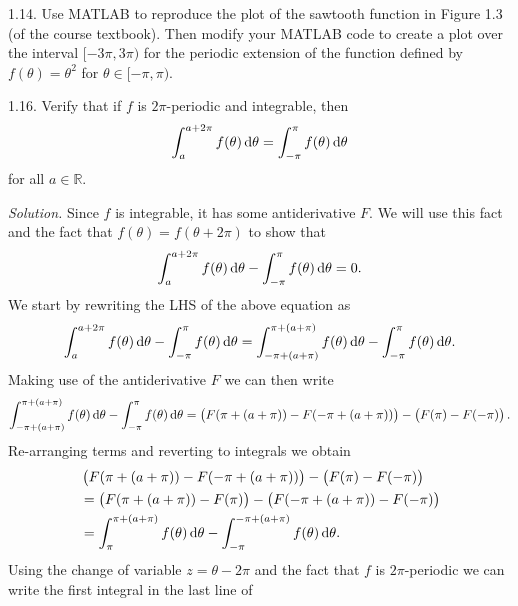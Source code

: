 \documentclass{article}
\newcommand{\R}{\mathbb{R}}
\begin{document}
\newpage

1.14. Use MATLAB to reproduce the plot of the sawtooth function in
  Figure 1.3 (of the course textbook). Then modify your MATLAB code to
  create a plot over the interval $[-3 \pi, 3 \pi)$ for the periodic
  extension of the function defined by $f(\theta) = \theta^2$ for
  $\theta \in [-\pi, \pi)$.

\newpage

1.16. Verify that if $f$ is $2\pi$-periodic and integrable, then
%
\begin{equation*}
    \int_a^{a + 2 \pi} f(\theta) \dif \theta = \int_{-\pi}^\pi f(\theta) \dif \theta
\end{equation*}
%
for all $a \in \R$.

\textit{Solution.} Since $f$ is integrable, it has some antiderivative
$F$. We will use this fact and the fact that $f(\theta) = f(\theta + 2
\pi)$ to show that
%
\begin{equation*}
    \int_a^{a + 2 \pi} f(\theta) \dif \theta - \int_{-\pi}^\pi f(\theta) \dif \theta = 0
    .
\end{equation*}
%
We start by rewriting the LHS of the above equation as
%
\begin{equation*}
    \int_a^{a + 2 \pi} f(\theta) \dif \theta - \int_{-\pi}^\pi f(\theta) \dif \theta
    =
    \int_{-\pi + (a + \pi)}^{\pi + (a + \pi)} f(\theta) \dif \theta - \int_{-\pi}^\pi f(\theta) \dif \theta
    .
\end{equation*}
%
Making use of the antiderivative $F$ we can then write
%
\begin{equation*}
    \int_{-\pi + (a + \pi)}^{\pi + (a + \pi)} f(\theta) \dif \theta - \int_{-\pi}^\pi f(\theta) \dif \theta
    =
    \del{F(\pi + (a + \pi)) - F(-\pi + (a + \pi))}
    -
    \del{F(\pi) - F(-\pi)}
    .
\end{equation*}
%
Re-arranging terms and reverting to integrals we obtain
%
\begin{align*}
    &\del{F(\pi + (a + \pi)) - F(-\pi + (a + \pi))}
    -
    \del{F(\pi) - F(-\pi)}
    \\
    &=
    \del{F(\pi + (a + \pi)) - F(\pi)}
    -
    \del{F(- \pi + (a + \pi)) - F(-\pi)}
    \\
    &=
    \int_{\pi}^{\pi + (a + \pi)} f(\theta) \dif \theta - \int_{-\pi}^{-\pi + (a + \pi)} f(\theta) \dif \theta
    .
\end{align*}
%
Using the change of variable $z = \theta - 2 \pi$ and the fact that $f$
is $2 \pi$-periodic we can write the first integral in the last line of
\end{document}
